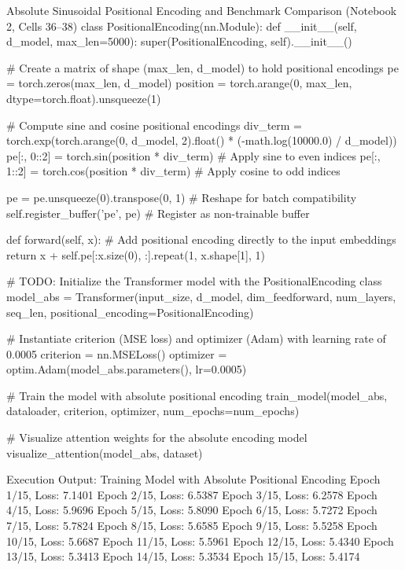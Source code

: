 \documentclass[11pt,a4paper]{article}
\begin{document}
\begin{solutioncode}[label=lst:abs_pos_encoding]{Absolute Sinusoidal Positional Encoding and Benchmark Comparison (Notebook 2, Cells 36--38)}
class PositionalEncoding(nn.Module):
    def __init__(self, d_model, max_len=5000):
        super(PositionalEncoding, self).__init__()
        
        # Create a matrix of shape (max_len, d_model) to hold positional encodings
        pe = torch.zeros(max_len, d_model)
        position = torch.arange(0, max_len, dtype=torch.float).unsqueeze(1)
        
        # Compute sine and cosine positional encodings
        div_term = torch.exp(torch.arange(0, d_model, 2).float() * (-math.log(10000.0) / d_model))
        pe[:, 0::2] = torch.sin(position * div_term)  # Apply sine to even indices
        pe[:, 1::2] = torch.cos(position * div_term)  # Apply cosine to odd indices
        
        pe = pe.unsqueeze(0).transpose(0, 1)  # Reshape for batch compatibility
        self.register_buffer('pe', pe)        # Register as non-trainable buffer

    def forward(self, x):
        # Add positional encoding directly to the input embeddings
        return x + self.pe[:x.size(0), :].repeat(1, x.shape[1], 1)

# TODO: Initialize the Transformer model with the PositionalEncoding class
model_abs = Transformer(input_size, d_model, dim_feedforward, num_layers, seq_len, positional_encoding=PositionalEncoding)

# Instantiate criterion (MSE loss) and optimizer (Adam) with learning rate of 0.0005
criterion = nn.MSELoss()
optimizer = optim.Adam(model_abs.parameters(), lr=0.0005)

# Train the model with absolute positional encoding
train_model(model_abs, dataloader, criterion, optimizer, num_epochs=num_epochs)

# Visualize attention weights for the absolute encoding model
visualize_attention(model_abs, dataset)
\end{solutioncode}

\begin{macterminal}{Execution Output: Training Model with Absolute Positional Encoding}
Epoch 1/15, Loss: 7.1401
Epoch 2/15, Loss: 6.5387
Epoch 3/15, Loss: 6.2578
Epoch 4/15, Loss: 5.9696
Epoch 5/15, Loss: 5.8090
Epoch 6/15, Loss: 5.7272
Epoch 7/15, Loss: 5.7824
Epoch 8/15, Loss: 5.6585
Epoch 9/15, Loss: 5.5258
Epoch 10/15, Loss: 5.6687
Epoch 11/15, Loss: 5.5961
Epoch 12/15, Loss: 5.4340
Epoch 13/15, Loss: 5.3413
Epoch 14/15, Loss: 5.3534
Epoch 15/15, Loss: 5.4174
\end{macterminal}
\end{document}

